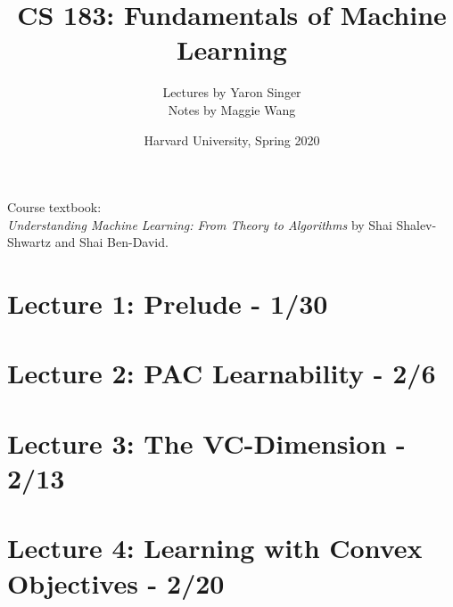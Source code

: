 \documentclass[8pt]{article}
\title{CS 183: Fundamentals of Machine Learning}
\author{Lectures by Yaron Singer \\
Notes by Maggie Wang}
\date{Harvard University, Spring 2020}
\begin{document}
\small

\maketitle

\noindent Course textbook: \\ \textit{Understanding Machine Learning: From Theory to Algorithms} by Shai Shalev-Shwartz and Shai Ben-David.

\begin{multicols*}{2}
  \tableofcontents
\end{multicols*}

\newpage

\fancyhfoffset[E,O]{0pt}

\twocolumn

\section{Lecture 1: Prelude - 1/30}


\newpage

\section{Lecture 2: PAC Learnability - 2/6}


\newpage

\section{Lecture 3: The VC-Dimension - 2/13}


\newpage

\section{Lecture 4: Learning with Convex Objectives - 2/20}

\end{document}

